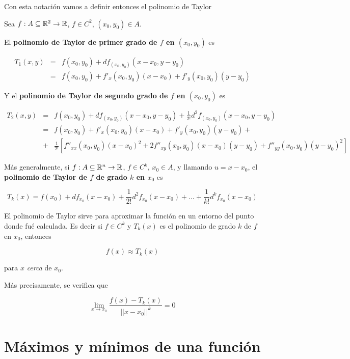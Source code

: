 Con esta notación vamos a definir entonces el polinomio de Taylor

\begin{definition}[Taylor]  
Sea $f: A \subseteq \mathbb{R}^2 \to \mathbb{R}$, $f \in C^2$, $(x_0, y_0) \in A$.

El \textbf{polinomio de Taylor de primer grado de $f$ en $(x_0, y_0)$} es

\begin{eqnarray*} T_1(x,y) &=& f(x_0,y_0) + df_{(x_0, y_0)}(x-x_0,y-y_0) \\ 
&=& f(x_0,y_0) + f'_x(x_0,y_0)(x-x_0) + f'_y(x_0,y_0)(y-y_0) \end{eqnarray*}

Y el \textbf{polinomio de Taylor de segundo grado de $f$ en $(x_0, y_0)$} es

\begin{eqnarray*} T_2(x,y) &=& f(x_0,y_0) + df_{(x_0,y_0)}(x-x_0,y-y_0) + \frac{1}{2!} d^2f_{(x_0,y_0)}(x-x_0,y-y_0) \\ 
&=& f(x_0,y_0) + f'_x(x_0,y_0)(x-x_0) + f'_y(x_0,y_0)(y-y_0) + \\
&+& \frac{1}{2!} \left[ f''_{xx}(x_0,y_0)(x-x_0)^2 + 2 f''_{xy}(x_0,y_0)(x-x_0)(y-y_0) + f''_{yy}(x_0,y_0)(y-y_0)^2 \right] \end{eqnarray*}

Más generalmente, si $f : A \subseteq \mathbb{R}^n \to \mathbb{R}$, $f \in C^k$, $x_0 \in A$, y llamando $u = x - x_0$, el \textbf{polinomio de Taylor de $f$ de grado $k$ en $x_0$} es

$$ T_k(x) = f(x_0) + df_{x_0}(x-x_0) + \frac{1}{2!} d^2f_{x_0}(x-x_0) + \ldots + \frac{1}{k!}d^kf_{x_0}(x-x_0) $$
\end{definition}

El polinomio de Taylor sirve para aproximar la función en un entorno del punto donde fué calculada.  Es decir si $f \in C^k$ y $T_k(x)$ es el polinomio de grado $k$ de $f$ en $x_0$, entonces

$$ f(x) \approx T_k(x)$$

para $x$ \emph{cerca} de $x_0$.

Más precisamente, se verifica que

$$ \lim_{x \to x_0} \frac{ f(x) - T_k(x) }{ ||x-x_0||^k } = 0$$

\section{Máximos y mínimos de una función}

